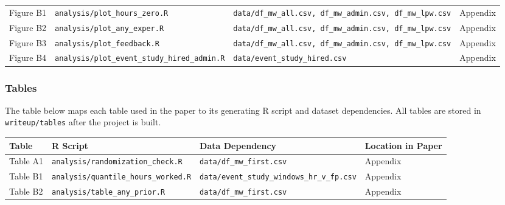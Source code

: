 \documentclass[10pt]{article}
\newenvironment{eightpt}{\begingroup\fontsize{8}{12.5}\selectfont}{\endgroup}
\begin{document}
\begin{eightpt}
\begin{tabularx}{\textwidth}{@{}p{}p{}p{}>{\centering\arraybackslash}p{}@{}}
Figure B1 & \texttt{analysis/plot\_hours\_zero.R} & \texttt{data/df\_mw\_all.csv, df\_mw\_admin.csv, df\_mw\_lpw.csv} & Appendix \\
Figure B2 & \texttt{analysis/plot\_any\_exper.R} & \texttt{data/df\_mw\_all.csv, df\_mw\_admin.csv, df\_mw\_lpw.csv} & Appendix \\
Figure B3 & \texttt{analysis/plot\_feedback.R} & \texttt{data/df\_mw\_all.csv, df\_mw\_admin.csv, df\_mw\_lpw.csv} & Appendix \\
Figure B4 & \texttt{analysis/plot\_event\_study\_hired\_admin.R} & \texttt{data/event\_study\_hired.csv} & Appendix \\
\bottomrule
\end{tabularx}
\end{eightpt}

\subsubsection{Tables}
The table below maps each table used in the paper to its generating R script and dataset dependencies. All tables are stored in \texttt{writeup/tables} after the project is built.

\begin{eightpt}
\begin{tabularx}{\textwidth}{@{}p{}p{}p{}>{\centering\arraybackslash}p{}@{}}
\toprule
Table & R Script & Data Dependency & Location in Paper \\
\midrule
Table A1 & \texttt{analysis/randomization\_check.R} & \texttt{data/df\_mw\_first.csv} & Appendix \\
Table B1 & \texttt{analysis/quantile\_hours\_worked.R} & \texttt{data/event\_study\_windows\_hr\_v\_fp.csv} & Appendix \\
Table B2 & \texttt{analysis/table\_any\_prior.R} & \texttt{data/df\_mw\_first.csv} & Appendix \\
\bottomrule
\end{tabularx}
\end{eightpt}
\end{document}
